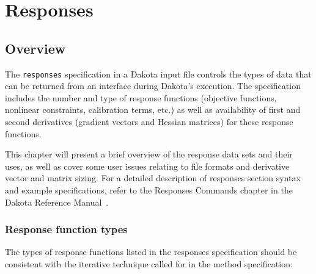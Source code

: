 \chapter{Responses}\label{responses}

\section{Overview}\label{responses:overview}

The \texttt{responses} specification in a Dakota input file controls
the types of data that can be returned from an interface during
Dakota's execution. The specification includes the number and type of
response functions (objective functions, nonlinear constraints, calibration 
terms, etc.) as well as availability of first and second
derivatives (gradient vectors and Hessian matrices) for these response
functions.

This chapter will present a brief overview of the response data sets
and their uses, as well as cover some user issues relating to file
formats and derivative vector and matrix sizing. For a detailed
description of responses section syntax and example specifications,
refer to the Responses Commands chapter in the Dakota Reference
Manual~\cite{RefMan}.

\subsection{Response function types}\label{responses:overview:types}

The types of response functions listed in the responses
specification should be consistent with the
iterative technique called for in the method specification:

